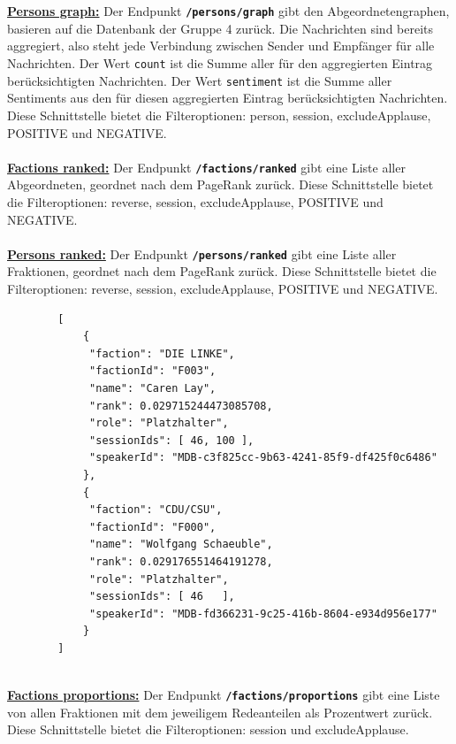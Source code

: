 \\~\\
\textbf{\underline{Persons graph:}}\newline
Der Endpunkt \textbf{\texttt{/persons/graph}} gibt den Abgeordnetengraphen, basieren auf die Datenbank der Gruppe 4 zurück. 
Die Nachrichten sind bereits aggregiert, also steht jede Verbindung zwischen Sender und Empfänger für alle Nachrichten. Der Wert \texttt{count} ist die Summe aller für den aggregierten Eintrag berücksichtigten Nachrichten. Der Wert \texttt{sentiment} ist die Summe aller Sentiments aus den für diesen aggregierten Eintrag berücksichtigten Nachrichten. Diese Schnittstelle bietet die Filteroptionen: person, session, excludeApplause, POSITIVE und NEGATIVE.	
\\~\\
\textbf{\underline{Factions ranked:}}\newline
Der Endpunkt \textbf{\texttt{/factions/ranked}} gibt eine Liste aller Abgeordneten, geordnet nach dem PageRank zurück. Diese Schnittstelle bietet die Filteroptionen: reverse, session, excludeApplause, POSITIVE und NEGATIVE.
\\~\\
\textbf{\underline{Persons ranked:}}\newline
Der Endpunkt \textbf{\texttt{/persons/ranked}} gibt eine Liste aller Fraktionen, geordnet nach dem PageRank zurück. Diese Schnittstelle bietet die Filteroptionen: reverse, session, excludeApplause, POSITIVE und NEGATIVE.
~\\
\begin{lstlisting}
		[
			{
			 "faction": "DIE LINKE",
			 "factionId": "F003", 
			 "name": "Caren Lay", 
			 "rank": 0.029715244473085708, 
			 "role": "Platzhalter",
			 "sessionIds": [ 46, 100 ],
			 "speakerId": "MDB-c3f825cc-9b63-4241-85f9-df425f0c6486"
			}, 
			{
			 "faction": "CDU/CSU",    
			 "factionId": "F000",
			 "name": "Wolfgang Schaeuble", 
			 "rank": 0.029176551464191278, 
			 "role": "Platzhalter",   
			 "sessionIds": [ 46   ], 
			 "speakerId": "MDB-fd366231-9c25-416b-8604-e934d956e177"
			}
		]
\end{lstlisting}
~\\	
\textbf{\underline{Factions proportions:}}\newline
Der Endpunkt \textbf{\texttt{/factions/proportions}} gibt eine Liste von allen Fraktionen mit dem jeweiligem Redeanteilen als Prozentwert zurück. Diese Schnittstelle bietet die Filteroptionen: session und excludeApplause.
\\~\\	
